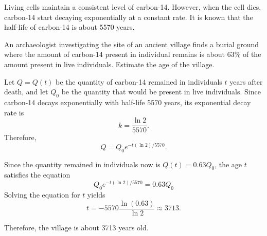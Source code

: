 \begin{exercise}
   Living cells maintain a consistent level of carbon-14. However, when the cell dies, carbon-14 start decaying exponentially at a constant rate. It is known that the half-life of carbon-14 is about 5570 years. 
   
   An archaeologist investigating the site of an ancient village finds a burial ground where the amount of carbon-14 present in individual remains is about 63\% of the amount present in live individuals. Estimate the age of the village.
\end{exercise}
\begin{exersol}
Let $Q=Q(t)$ be the quantity of carbon-14 remained in individuals $t$ years after death, and let $Q_0$ be the quantity that would be present in live individuals. Since carbon-14 decays exponentially with half-life 5570 years, its exponential decay rate is
\[k=\frac{\ln2}{5570}.\]
Therefore,
\[Q=Q_0e^{-t(\ln2)/5570}.\]

Since the quantity remained in individuals now is $Q(t)=0.63Q_0$, the age $t$ satisfies the equation
\[Q_0e^{-t(\ln2)/5570}=0.63Q_0\]
Solving the equation for $t$ yields
\[t=-5570 \frac{\ln(0.63)}{\ln2} \approx 3713.\]

Therefore, the village is about 3713 years old.
\end{exersol}




